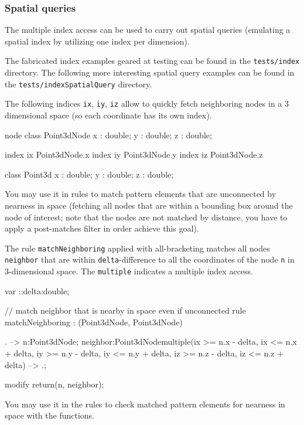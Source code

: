 \subsubsection*{Spatial queries}

The multiple index access can be used to carry out spatial queries (emulating a spatial index by utilizing one index per dimension).

The fabricated index examples geared at testing can be found in the \texttt{tests/index} directory.
The following more interesting spatial query examples can be found in the \texttt{tests/indexSpatialQuery} directory.


\begin{example}
The following indices \texttt{ix}, \texttt{iy}, \texttt{iz} allow to quickly fetch neighboring nodes in a 3 dimensional space (so each coordinate has its own index).

\begin{grgen}
node class Point3dNode {
  x : double;
  y : double;
  z : double;
}

index ix { Point3dNode.x }
index iy { Point3dNode.y }
index iz { Point3dNode.z }

class Point3d {
  x : double;
  y : double;
  z : double;
}
\end{grgen}

You may use it in rules to match pattern elements that are unconnected by nearness in space (fetching all nodes that are within a bounding box around the node of interest; note that the nodes are not matched by distance, you have to apply a post-matches filter in order achieve this goal).

The rule \texttt{matchNeighboring} applied with all-bracketing matches all nodes \texttt{neighbor} that are within
\texttt{delta}-difference to all the coordinates of the node \texttt{n} in $3$-dimensional space.
The \texttt{multiple} indicates a multiple index access.

\begin{grgen}
var ::delta:double;

// match neighbor that is nearby in space even if unconnected
rule matchNeighboring : (Point3dNode, Point3dNode) {
  . --> n:Point3dNode;
  neighbor:Point3dNode{multiple(ix >= n.x - delta, ix <= n.x + delta, iy >= n.y - delta, iy <= n.y + delta, iz >= n.z - delta, iz <= n.z + delta)} --> .;

  modify {
    return(n, neighbor);
  }
}
\end{grgen}

You may use it in the rules to check matched pattern elements for nearness in space with the functions.


\end{example}
